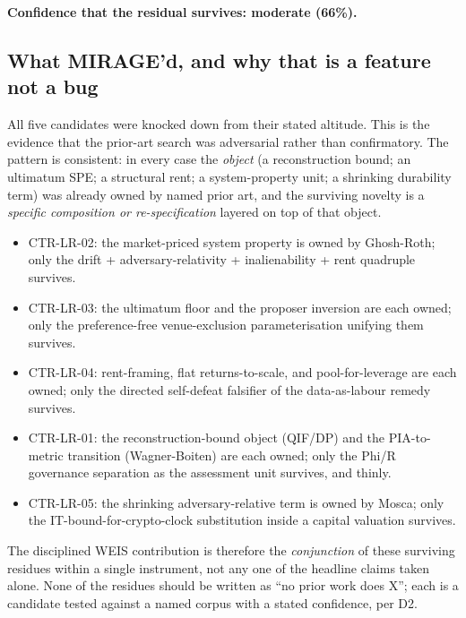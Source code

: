 \documentclass[
  11pt,
]{article}
\providecommand{\tightlist}{%
  \setlength{\itemsep}{0pt}\setlength{\parskip}{0pt}}
\begin{document}
\textbf{Confidence that the residual survives: moderate (66\%).}

\subsection{What MIRAGE'd, and why that is a feature not a
bug}\label{what-miraged-and-why-that-is-a-feature-not-a-bug}

All five candidates were knocked down from their stated altitude. This
is the evidence that the prior-art search was adversarial rather than
confirmatory. The pattern is consistent: in every case the \emph{object}
(a reconstruction bound; an ultimatum SPE; a structural rent; a
system-property unit; a shrinking durability term) was already owned by
named prior art, and the surviving novelty is a \emph{specific
composition or re-specification} layered on top of that object.

\begin{itemize}
\tightlist
\item
  CTR-LR-02: the market-priced system property is owned by Ghosh-Roth;
  only the drift + adversary-relativity + inalienability + rent
  quadruple survives.
\item
  CTR-LR-03: the ultimatum floor and the proposer inversion are each
  owned; only the preference-free venue-exclusion parameterisation
  unifying them survives.
\item
  CTR-LR-04: rent-framing, flat returns-to-scale, and pool-for-leverage
  are each owned; only the directed self-defeat falsifier of the
  data-as-labour remedy survives.
\item
  CTR-LR-01: the reconstruction-bound object (QIF/DP) and the
  PIA-to-metric transition (Wagner-Boiten) are each owned; only the
  Phi/R governance separation as the assessment unit survives, and
  thinly.
\item
  CTR-LR-05: the shrinking adversary-relative term is owned by Mosca;
  only the IT-bound-for-crypto-clock substitution inside a capital
  valuation survives.
\end{itemize}

The disciplined WEIS contribution is therefore the \emph{conjunction} of
these surviving residues within a single instrument, not any one of the
headline claims taken alone. None of the residues should be written as
``no prior work does X''; each is a candidate tested against a named
corpus with a stated confidence, per D2.

\newpage
\end{document}
